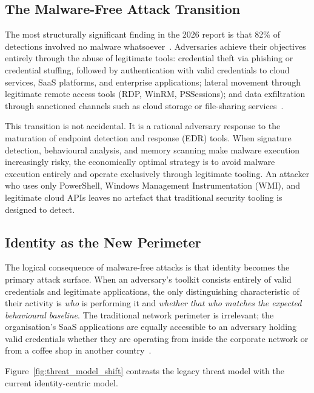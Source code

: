 \documentclass[journal]{IEEEtran}
\begin{document}
\subsection{The Malware-Free Attack Transition}

The most structurally significant finding in the 2026 report is that 82\% of
detections involved no malware whatsoever~\cite{cs2026gtr}. Adversaries achieve
their objectives entirely through the abuse of legitimate tools: credential
theft via phishing or credential stuffing, followed by authentication with valid
credentials to cloud services, SaaS platforms, and enterprise applications;
lateral movement through legitimate remote access tools (RDP, WinRM, PSSessions);
and data exfiltration through sanctioned channels such as cloud storage or
file-sharing services~\cite{cs2026press}.

This transition is not accidental. It is a rational adversary response to the
maturation of endpoint detection and response (EDR) tools. When signature detection,
behavioural analysis, and memory scanning make malware execution increasingly risky,
the economically optimal strategy is to avoid malware execution entirely and operate
exclusively through legitimate tooling. An attacker who uses only PowerShell, Windows
Management Instrumentation (WMI), and legitimate cloud APIs leaves no artefact that
traditional security tooling is designed to detect.

\subsection{Identity as the New Perimeter}

The logical consequence of malware-free attacks is that identity becomes the primary
attack surface. When an adversary's toolkit consists entirely of valid credentials
and legitimate applications, the only distinguishing characteristic of their activity
is \emph{who} is performing it and \emph{whether that who matches the expected
behavioural baseline}. The traditional network perimeter is irrelevant; the
organisation's SaaS applications are equally accessible to an adversary holding
valid credentials whether they are operating from inside the corporate network or
from a coffee shop in another country~\cite{cs2026press}.

Figure~\ref{fig:threat_model_shift} contrasts the legacy threat model with the
current identity-centric model.
\end{document}
